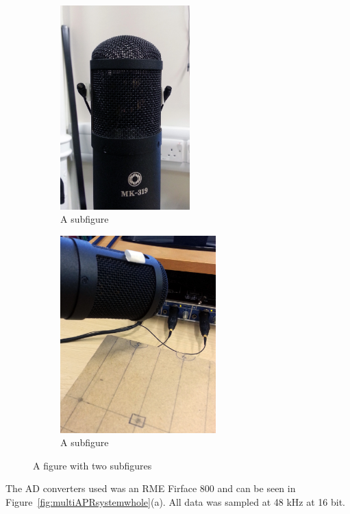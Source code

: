 \begin{figure}
\centering
\begin{subfigure}{.5\textwidth}
  \centering
  \includegraphics[width=5cm]{micsAlign}
  \caption{A subfigure}
  \label{fig:sub1}
\end{subfigure}%
\begin{subfigure}{.5\textwidth}
  \centering
  \includegraphics[width=6cm]{mic1}
  \caption{A subfigure}
  \label{fig:sub2}
\end{subfigure}
\caption{A figure with two subfigures}
\label{fig:mic1}
\end{figure}

The AD converters used was an RME Firface 800 and can be seen in Figure~\ref{fig:multiAPRsystemwhole}(a). All data was sampled at 48 kHz at 16 bit.


